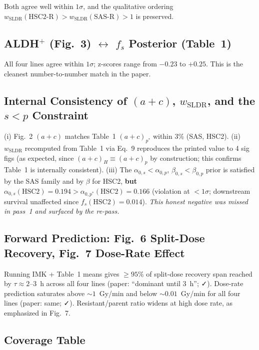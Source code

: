 \documentclass[11pt]{article}
\begin{document}
Both agree well within $1\sigma$, and the qualitative ordering
$w_{\mathrm{SLDR}}(\text{HSC2-R}) > w_{\mathrm{SLDR}}(\text{SAS-R}) > 1$ is preserved.

\subsection{ALDH$^{+}$ (Fig.~3) $\leftrightarrow$ $f_s$ Posterior (Table~1)}

All four lines agree within $1\sigma$; z-scores range from $-0.23$ to $+0.25$. This is the cleanest
number-to-number match in the paper.

\subsection{Internal Consistency of $(a+c)$, $w_{\mathrm{SLDR}}$, and the $s<p$ Constraint}

(i) Fig.~2 $(a+c)$ matches Table~1 $(a+c)_{p^{*}}$ within 3\% (SAS, HSC2). (ii) $w_{\mathrm{SLDR}}$
recomputed from Table~1 via Eq.~9 reproduces the printed value to 4 sig figs (as expected, since
$(a+c)_H \equiv (a+c)_p$ by construction; this confirms Table~1 is internally consistent).
(iii) The $\alpha_{0,s} < \alpha_{0,p}$, $\beta_{0,s} < \beta_{0,p}$ prior is satisfied by the
SAS family and by $\beta$ for HSC2, \textbf{but} $\alpha_{0,s}(\text{HSC2}) = 0.194 >
\alpha_{0,p^{*}}(\text{HSC2}) = 0.166$ (violation at $<1\sigma$; downstream survival unaffected
since $f_s(\text{HSC2}) = 0.014$). \emph{This honest negative was missed in pass~1 and surfaced by
the re-pass.}

\subsection{Forward Prediction: Fig.~6 Split-Dose Recovery, Fig.~7 Dose-Rate Effect}

Running IMK + Table~1 means gives $\geq 95\%$ of split-dose recovery span reached by
$\tau \approx 2$--$3$~h across all four lines (paper: ``dominant until 3~h''; ✓). Dose-rate
prediction saturates above $\sim 1$~Gy/min and below $\sim 0.01$~Gy/min for all four lines
(paper: same; ✓). Resistant/parent ratio widens at high dose rate, as emphasized in Fig.~7.

\subsection{Coverage Table}
\end{document}

